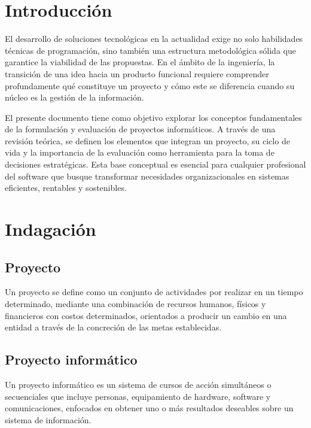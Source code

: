 \documentclass[12pt]{article}
\begin{document}
\tableofcontents
\newpage

\justifying 

\section{Introducción}
El desarrollo de soluciones tecnológicas en la actualidad exige no solo habilidades técnicas de programación, sino también una estructura metodológica sólida que garantice la viabilidad de las propuestas. En el ámbito de la ingeniería, la transición de una idea hacia un producto funcional requiere comprender profundamente qué constituye un proyecto y cómo este se diferencia cuando su núcleo es la gestión de la información.

El presente documento tiene como objetivo explorar los conceptos fundamentales de la formulación y evaluación de proyectos informáticos. A través de una revisión teórica, se definen los elementos que integran un proyecto, su ciclo de vida y la importancia de la evaluación como herramienta para la toma de decisiones estratégicas. Esta base conceptual es esencial para cualquier profesional del software que busque transformar necesidades organizacionales en sistemas eficientes, rentables y sostenibles.

\section{Indagación}

\subsection{Proyecto}
Un proyecto se define como un conjunto de actividades por realizar en un tiempo determinado, mediante una combinación de recursos humanos, físicos y financieros con costos determinados, orientados a producir un cambio en una entidad a través de la concreción de las metas establecidas. \cite{gonzalez2009guia}

\subsection{Proyecto informático}
Un proyecto informático es un sistema de cursos de acción simultáneos o secuenciales que incluye personas, equipamiento de hardware, software y comunicaciones, enfocados en obtener uno o más resultados deseables sobre un sistema de información. \cite{adrian2025proyectos}
\end{document}
